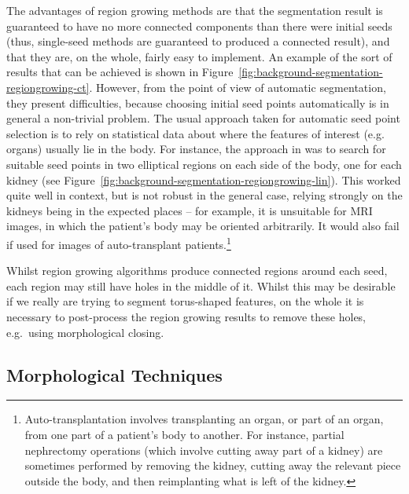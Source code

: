 
The advantages of region growing methods are that the segmentation result is guaranteed to have no more connected components than there were initial seeds (thus, single-seed methods are guaranteed to produced a connected result), and that they are, on the whole, fairly easy to implement. An example of the sort of results that can be achieved is shown in Figure~\ref{fig:background-segmentation-regiongrowing-ct}. However, from the point of view of automatic segmentation, they present difficulties, because choosing initial seed points automatically is in general a non-trivial problem. The usual approach taken for automatic seed point selection is to rely on statistical data about where the features of interest (e.g. organs) usually lie in the body. For instance, the approach in \cite{lin06} was to search for suitable seed points in two elliptical regions on each side of the body, one for each kidney (see Figure~\ref{fig:background-segmentation-regiongrowing-lin}). This worked quite well in context, but is not robust in the general case, relying strongly on the kidneys being in the expected places -- for example, it is unsuitable for MRI images, in which the patient's body may be oriented arbitrarily. It would also fail if used for images of auto-transplant patients.\footnote{Auto-transplantation involves transplanting an organ, or part of an organ, from one part of a patient's body to another. For instance, partial nephrectomy operations (which involve cutting away part of a kidney) are sometimes performed by removing the kidney, cutting away the relevant piece outside the body, and then reimplanting what is left of the kidney.}

Whilst region growing algorithms produce connected regions around each seed, each region may still have holes in the middle of it. Whilst this may be desirable if we really are trying to segment torus-shaped features, on the whole it is necessary to post-process the region growing results to remove these holes, e.g.~using morphological closing.


\subsection{Morphological Techniques}
\label{subsec:background-segmentation-morphology}

